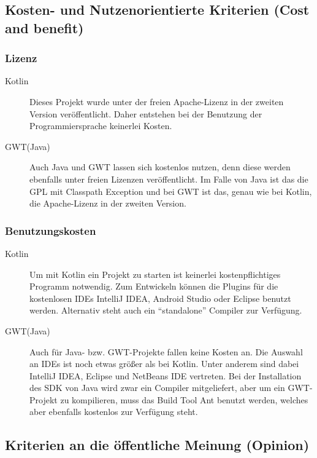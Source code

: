 \subsection{Kosten- und Nutzenorientierte Kriterien (Cost and benefit)}
\subsubsection{Lizenz}
\begin{description}
	\item[Kotlin] Dieses Projekt wurde unter der freien Apache-Lizenz in der zweiten Version veröffentlicht. Daher entstehen bei der Benutzung der Programmiersprache keinerlei Kosten. \cite{kotlinFree}
	\item[GWT(Java)] Auch Java und \gls{GWT} lassen sich kostenlos nutzen, denn diese werden ebenfalls unter freien Lizenzen veröffentlicht. Im Falle von Java ist das die \gls{GPL} mit Classpath Exception und bei \gls{GWT} ist das, genau wie bei Kotlin, die Apache-Lizenz in der zweiten Version. \cite{javaLicense, gwtTerms}
\end{description}

\subsubsection{Benutzungskosten}
\begin{description}
	\item[Kotlin] Um mit Kotlin ein Projekt zu starten ist keinerlei kostenpflichtiges Programm notwendig. Zum Entwickeln können die Plugins für die kostenlosen \glspl{IDE} IntelliJ IDEA, Android Studio oder Eclipse benutzt werden. Alternativ steht auch ein \enquote{standalone} Compiler zur Verfügung.
	\item[GWT(Java)] Auch für Java- bzw. \gls{GWT}-Projekte fallen keine Kosten an. Die Auswahl an \glspl{IDE} ist noch etwas größer als bei Kotlin. Unter anderem sind dabei IntelliJ IDEA, Eclipse und NetBeans IDE vertreten. Bei der Installation des \gls{SDK} von Java wird zwar ein Compiler mitgeliefert, aber um ein \gls{GWT}-Projekt zu kompilieren, muss das Build Tool Ant benutzt werden, welches aber ebenfalls kostenlos zur Verfügung steht.
\end{description}


\subsection{Kriterien an die öffentliche Meinung (Opinion)}
